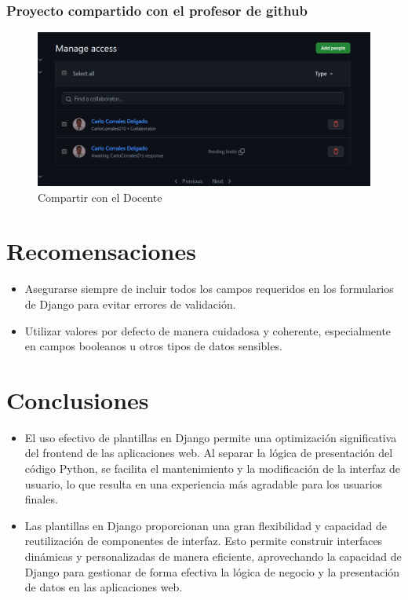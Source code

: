 \documentclass{article}
\begin{document}
  \subsubsection{Proyecto compartido con el profesor de github}
  \begin{figure}[H]
    \centering
    \includegraphics[width=1\textwidth, keepaspectratio]{img/compartir.png}
    \caption{Compartir con el Docente}
  \end{figure}
  

  \section{Recomensaciones}
  \begin{itemize}
    \item Asegurarse siempre de incluir todos los campos requeridos en los formularios de Django para evitar errores de validación. 
    \item Utilizar valores por defecto de manera cuidadosa y coherente, especialmente en campos booleanos u otros tipos de datos sensibles.
  \end{itemize}


  \section{Conclusiones}
  \begin{itemize}
    \item El uso efectivo de plantillas en Django permite una optimización significativa del frontend de las aplicaciones web. 
    Al separar la lógica de presentación del código Python, se facilita el mantenimiento y la modificación de la interfaz de 
    usuario, lo que resulta en una experiencia más agradable para los usuarios finales.
    \item Las plantillas en Django proporcionan una gran flexibilidad y capacidad de reutilización de componentes de interfaz. 
    Esto permite construir interfaces dinámicas y personalizadas de manera eficiente, aprovechando la capacidad de Django para 
    gestionar de forma efectiva la lógica de negocio y la presentación de datos en las aplicaciones web.
  \end{itemize}
  
\end{document}

